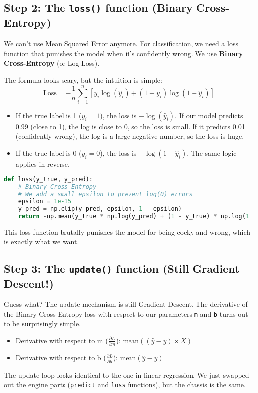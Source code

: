 \documentclass[11pt, letterpaper, openany]{book}
\begin{document}
\subsection{Step 2: The \texttt{loss()} function (Binary Cross-Entropy)}

We can't use Mean Squared Error anymore. For classification, we need a loss function that punishes the model when it's confidently wrong. We use \textbf{Binary Cross-Entropy} (or Log Loss).

The formula looks scary, but the intuition is simple:
\[ \text{Loss} = -\frac{1}{n} \sum_{i=1}^{n} [y_i \log(\hat{y}_i) + (1-y_i) \log(1-\hat{y}_i)] \]
\begin{itemize}
    \item If the true label is 1 ($y_i=1$), the loss is $-\log(\hat{y}_i)$. If our model predicts 0.99 (close to 1), the log is close to 0, so the loss is small. If it predicts 0.01 (confidently wrong), the log is a large negative number, so the loss is huge.
    \item If the true label is 0 ($y_i=0$), the loss is $-\log(1-\hat{y}_i)$. The same logic applies in reverse.
\end{itemize}

\begin{lstlisting}[language=Python]
def loss(y_true, y_pred):
    # Binary Cross-Entropy
    # We add a small epsilon to prevent log(0) errors
    epsilon = 1e-15
    y_pred = np.clip(y_pred, epsilon, 1 - epsilon)
    return -np.mean(y_true * np.log(y_pred) + (1 - y_true) * np.log(1 - y_pred))
\end{lstlisting}

This loss function brutally punishes the model for being cocky and wrong, which is exactly what we want.

\subsection{Step 3: The \texttt{update()} function (Still Gradient Descent!)}

Guess what? The update mechanism is still Gradient Descent. The derivative of the Binary Cross-Entropy loss with respect to our parameters \texttt{m} and \texttt{b} turns out to be surprisingly simple.
\begin{itemize}
    \item Derivative with respect to m ($\frac{\partial L}{\partial m}$): $\text{mean}((\hat{y} - y) \times X)$
    \item Derivative with respect to b ($\frac{\partial L}{\partial b}$): $\text{mean}(\hat{y} - y)$
\end{itemize}
The update loop looks identical to the one in linear regression. We just swapped out the engine parts (\texttt{predict} and \texttt{loss} functions), but the chassis is the same.
\end{document}
